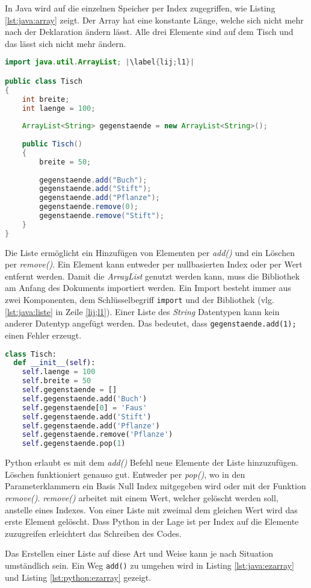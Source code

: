In Java wird auf die einzelnen Speicher per Index zugegriffen, wie Listing \ref{lst:java:array} zeigt. Der Array hat eine konstante Länge, welche sich nicht mehr nach der Deklaration ändern lässt. Alle drei Elemente sind auf dem Tisch und das lässt sich nicht mehr ändern.
\newpage
\begin{lstlisting}[language=java,caption={Liste in Java},captionpos=b,label={lst:java:liste},frame=none,escapechar=|]
import java.util.ArrayList; |\label{lij;l1}|

public class Tisch
{
    int breite;
    int laenge = 100;
  
    ArrayList<String> gegenstaende = new ArrayList<String>();
  
    public Tisch()
    {
        breite = 50;
    
        gegenstaende.add("Buch");
        gegenstaende.add("Stift");
        gegenstaende.add("Pflanze");
        gegenstaende.remove(0);
        gegenstaende.remove("Stift");
    }
}
\end{lstlisting}

Die Liste ermöglicht ein Hinzufügen von Elementen per \textit{add()} und ein Löschen per \textit{remove()}. Ein Element kann entweder per nullbasierten Index oder per Wert entfernt werden. Damit die \textit{ArrayList} genutzt werden kann, muss die Bibliothek am Anfang des Dokuments importiert werden. Ein Import besteht immer aus zwei Komponenten, dem Schlüsselbegriff \texttt{import}  und der Bibliothek (vlg. \ref{lst:java:liste} in Zeile \ref{lij;l1}). Einer Liste des \textit{String} Datentypen kann kein anderer Datentyp angefügt werden. Das bedeutet, dass \texttt{gegenstaende.add(1);} einen Fehler erzeugt.

\begin{lstlisting}[language=python,caption={Liste in Python},captionpos=b,label={lst:python:liste},frame=none]
class Tisch:
  def __init__(self):
    self.laenge = 100
    self.breite = 50
    self.gegenstaende = []
    self.gegenstaende.add('Buch')
    self.gegenstaende[0] = 'Faus'
    self.gegenstaende.add('Stift')
    self.gegenstaende.add('Pflanze')
    self.gegenstaende.remove('Pflanze')
    self.gegenstaende.pop(1)
\end{lstlisting}

Python erlaubt es mit dem \textit{add()} Befehl neue Elemente der Liste hinzuzufügen. Löschen funktioniert genauso gut. Entweder per \textit{pop()}, wo in den Parameterklammern ein Basis Null Index mitgegeben wird oder mit der Funktion \textit{remove()}. \textit{remove()} arbeitet mit einem Wert, welcher gelöscht werden soll, anstelle eines Indexes. Von einer Liste mit zweimal dem gleichen Wert wird das erste Element gelöscht. Dass Python in der Lage ist per Index auf die Elemente zuzugreifen erleichtert das Schreiben des Codes.\par
Das Erstellen einer Liste auf diese Art und Weise kann je nach Situation umständlich sein. Ein Weg \texttt{add()} zu umgehen wird in Listing \ref{lst:java:ezarray} und Listing \ref{lst:python:ezarray} gezeigt.

